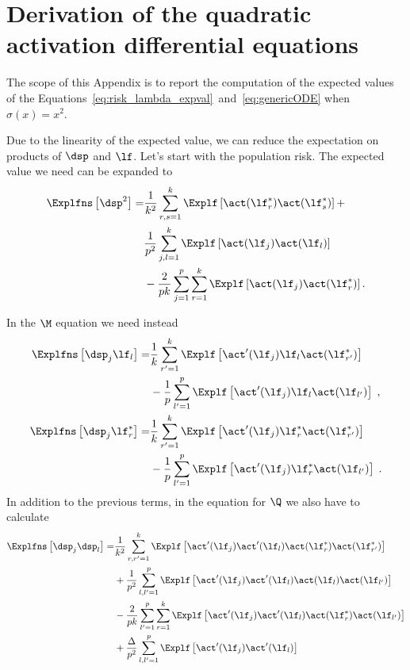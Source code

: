 \chapter[Derivation of the quadratic activation ODEs]{Derivation of the quadratic activation differential equations}
\label{app:derivation-quadratic-ode}

The scope of this Appendix is to report the computation of the expected values of the
Equations~\eqref{eq:risk_lambda_expval}~and~\eqref{eq:genericODE} when \(\sigma(x) = x^2\).

Due to the linearity of the expected value, we can reduce the expectation on products of \(\dsp\) and \(\lf\).
Let's start with the population risk. The expected value we need can be expanded to 
\[\begin{split}
  \Explfns \left[  \dsp^2  \right]  =&
    \frac{1}{k^2} \sum_{r, s =1}^k \Explf\left[ \act(\lf_{r}^*) \act(\lf_{s}^*)  \right] +
  \\
  & \frac{1}{p^2} \sum_{j, l =1}^k \Explf\left[ \act(\lf_{j}) \act(\lf_{l}) \right]
  \\
  & - \frac{2}{pk}  \sum_{j=1}^p \sum_{r=1}^k \Explf\left[ \act(\lf_{j}) \act(\lf_{r}^*) \right].
\end{split}\]

In the \(\M\) equation we need instead
\[\begin{split}
  \Explfns \left[  \dsp_{j} \lf_{l}  \right]  =&  
  \frac{1}{k} \sum_{r' =1}^{k} \Explf  \left[\act' (\lf_{j}) \lf_l \act( \lf_{r'}^{*}  )  \right]
   \\
   &  -  \frac{1}{p} \sum_{l' = 1}^{p} \Explf \left[ \act' (\lf_{j}) \lf_l   \act ( \lf_{l'}  ) \right] \;, 
  \\
   \Explfns   \left[  \dsp_{j} \lf_{r}^*  \right]  =&    \frac{1}{k} \sum_{r'=1}^{k}   \Explf   \left[\act' (\lf_{j}) \lf_{r}^* \act( \lf_{r'}^{*}  )  \right]
   \\
   &   -   \frac{1}{p} \sum_{l' = 1}^{p} \Explf \left[ \act' (\lf_{j}) \lf_{r}^*   \act ( \lf_{l'}  ) \right]  \;.
\end{split}\]
In addition to the previous terms, in the equation for \(\Q\) we also have to calculate
\[\begin{split}
  \Explfns \left[  \dsp_{j} \dsp_{l}  \right]  =&  
  \frac{1}{k^2} \sum_{ r ,  r' =1}^{k} \Explf  \left[\act' (\lf_{j}) 
  \act' (\lf_{l}) \act (\lf_{r}^*  ) \act ( \lf_{r'}^{*}  )  \right]  \\
  & + \frac{1}{p^2} \sum_{ l ,  l' =1}^{p} \Explf  \left[\act' (\lf_{j}) 
  \act' (\lf_{l}) \act (\lf_{l}  ) \act ( \lf_{l'}  )  \right]  \\ 
  & - \frac{2}{pk} \sum_{ l' =1}^{p} \sum_{ r =1}^{k} \Explf  \left[\act' (\lf_{j}) 
  \act' (\lf_{l}) \act (\lf_{r}^*  ) \act ( \lf_{l'}  )  \right]  \\
  & + \frac{\Delta}{p^2} \sum_{ l ,  l' =1}^{p} \Explf  \left[\act' (\lf_{j}) 
  \act' (\lf_{l})  \right]
\end{split}\]

